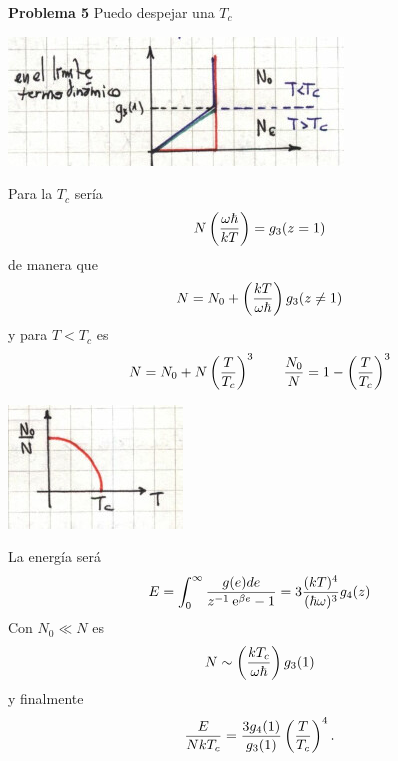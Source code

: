 \documentclass[10pt,oneside]{CBFT_book}
\begin{document}
\begin{ejemplo}{\bf Problema 5}
Puedo despejar una $T_c$

\includegraphics[scale=0.4]{images/1606329660.jpg}

Para la $T_c$ sería
\[
	N \left( \frac{  \omega \hbar  }{  kT  } \right) = g_3(z=1)
\]
de manera que 
\[
	N = N_0 + \left( \frac{  kT  }{  \omega \hbar  } \right)g_3(z\neq 1)
\]
y para $T < T_c$ es 
\[
	N = N_0 + N \left( \frac{ T }{ T_c } \right)^3 \qquad  \frac{N_0}{N} = 1 - \left( \frac{ T }{ T_c } \right)^3
\]

\includegraphics[scale=0.4]{images/1606329664.jpg}

La energía será
\[
	E = \int_0^\infty \frac{ g(e) de }{ z^{-1} \:\mathrm{e}^{\beta e} - 1} = 
	3 \frac{( k T )^4}{( \hbar \omega )^3} g_4(z)
\]
Con $N_0 \ll N $ es 
\[
	 N \sim \left( \frac{  kT_c  }{  \omega \hbar  } \right)g_3(1)
\]
y finalmente
\[
	\frac{ E }{ N k T_c } = \frac{3 g_4(1)}{g_3(1)} \left( \frac{ T }{ T_c } \right)^4.
\]

\end{ejemplo}
\end{document}
